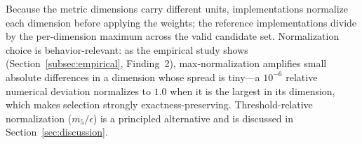Because the metric dimensions carry different units, implementations
normalize each dimension before applying the weights; the reference
implementations divide by the per-dimension maximum across the valid
candidate set. Normalization choice is behavior-relevant: as the
empirical study shows (Section~\ref{subsec:empirical}, Finding~2),
max-normalization amplifies small absolute differences in a dimension
whose spread is tiny---a $10^{-6}$ relative numerical deviation
normalizes to $1.0$ when it is the largest in its dimension, which
makes selection strongly exactness-preserving. Threshold-relative
normalization ($m_5 / \epsilon$) is a principled alternative and is
discussed in Section~\ref{sec:discussion}.
